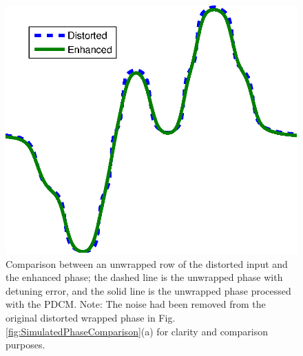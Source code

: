 \begin{figure}[th!]
  \begin{center}
      \includegraphics[scale=0.75]{Chpt4_figures/2D_error.eps}
  \end{center}
  \caption{Comparison between an unwrapped row of the distorted input 
  and the enhanced phase; the dashed line is the unwrapped phase with detuning 
  error, and the solid line is the unwrapped phase processed with the PDCM. 
  Note: The noise had been removed from the original distorted wrapped
  phase in Fig. \ref{fig:SimulatedPhaseComparison}(a) for clarity and
  comparison purposes.}
  \label{fig:SimulatedPhaseComparisontemp}
\end{figure}

